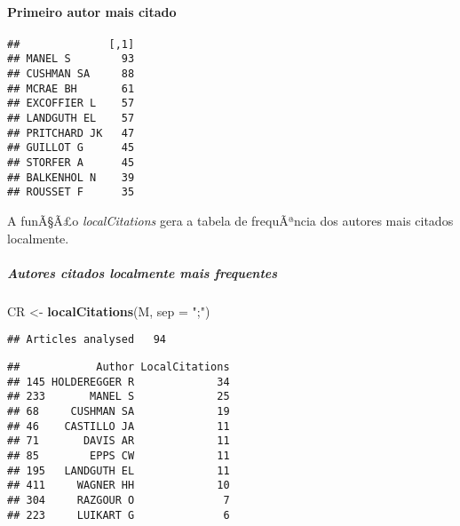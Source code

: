 \documentclass[]{article}
\newenvironment{Shaded}{\begin{snugshade}}{\end{snugshade}}
\newcommand{\KeywordTok}[1]{\textcolor[rgb]{0.13,0.29,0.53}{\textbf{#1}}}
\newcommand{\DataTypeTok}[1]{\textcolor[rgb]{0.13,0.29,0.53}{#1}}
\newcommand{\DecValTok}[1]{\textcolor[rgb]{0.00,0.00,0.81}{#1}}
\newcommand{\StringTok}[1]{\textcolor[rgb]{0.31,0.60,0.02}{#1}}
\newcommand{\OperatorTok}[1]{\textcolor[rgb]{0.81,0.36,0.00}{\textbf{#1}}}
\newcommand{\NormalTok}[1]{#1}
\let\oldparagraph\paragraph
\renewcommand{\paragraph}[1]{\oldparagraph{#1}\mbox{}}
\let\oldsubparagraph\subparagraph
\renewcommand{\subparagraph}[1]{\oldsubparagraph{#1}\mbox{}}
\begin{document}
\paragraph{Primeiro autor mais citado}\label{primeiro-autor-mais-citado}

\begin{Shaded}
\end{Shaded}

\begin{verbatim}
##              [,1]
## MANEL S        93
## CUSHMAN SA     88
## MCRAE BH       61
## EXCOFFIER L    57
## LANDGUTH EL    57
## PRITCHARD JK   47
## GUILLOT G      45
## STORFER A      45
## BALKENHOL N    39
## ROUSSET F      35
\end{verbatim}

A funÃ§Ã£o \emph{localCitations} gera a tabela de frequÃªncia dos
autores mais citados localmente.

\subparagraph{Autores citados localmente mais
frequentes}\label{autores-citados-localmente-mais-frequentes}

\begin{Shaded}
\begin{Highlighting}[]
\NormalTok{CR <-}\StringTok{ }\KeywordTok{localCitations}\NormalTok{(M, }\DataTypeTok{sep =} \StringTok{";"}\NormalTok{)}
\end{Highlighting}
\end{Shaded}

\begin{verbatim}
## Articles analysed   94
\end{verbatim}

\begin{Shaded}
\end{Shaded}

\begin{verbatim}
##            Author LocalCitations
## 145 HOLDEREGGER R             34
## 233       MANEL S             25
## 68     CUSHMAN SA             19
## 46    CASTILLO JA             11
## 71       DAVIS AR             11
## 85        EPPS CW             11
## 195   LANDGUTH EL             11
## 411     WAGNER HH             10
## 304     RAZGOUR O              7
## 223     LUIKART G              6
\end{verbatim}
\end{document}
